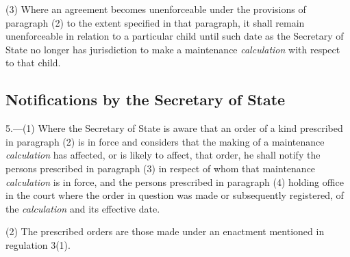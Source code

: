 \documentclass[12pt,a4paper]{article}
\begin{document}
(3) Where an agreement becomes unenforceable under the provisions of paragraph (2) to the extent specified in that paragraph, it shall remain unenforceable in relation to a particular child until such date as 
the Secretary of State  %
no longer has jurisdiction to make a maintenance 
\emph{calculation} 
with respect to that child.



\subsection[5. Notifications by the Secretary of State]{Notifications by the Secretary of State}

5.—(1) Where 
the Secretary of State  %
is aware that an order of a kind prescribed in paragraph (2) is in force and considers that the making of a maintenance 
\emph{calculation}
has affected, or is likely to affect, that order, he shall notify the persons prescribed in paragraph (3) in respect of whom that maintenance 
\emph{calculation} 
is in force, and the persons prescribed in paragraph (4) holding office in the court where the order in question was made or subsequently registered, of the 
\emph{calculation}
and its effective date.

(2) The prescribed orders are those made under an enactment mentioned in regulation 3(1).
\end{document}

